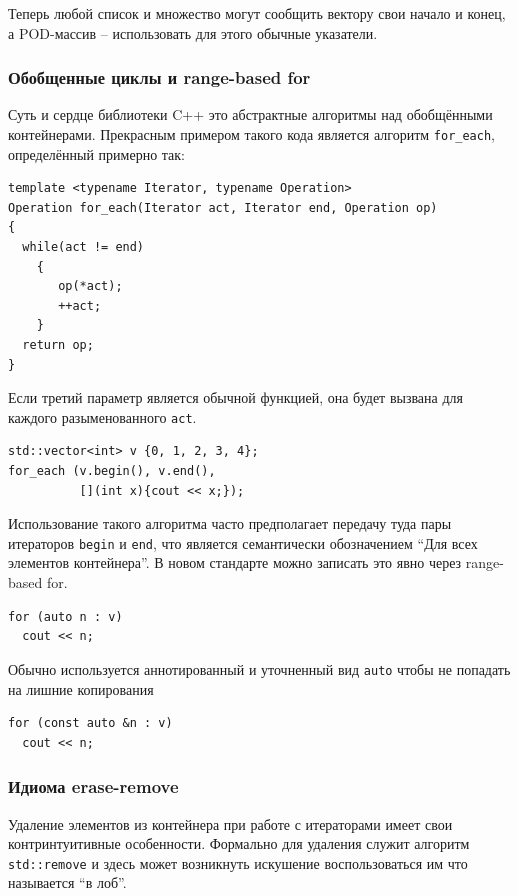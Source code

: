 \documentclass[a4paper,12pt,oneside]{article}
\begin{document}
Теперь любой список и множество могут сообщить вектору свои начало и конец, а POD-массив -- использовать для этого обычные указатели.

\subsubsection{Обобщенные циклы и range-based for}

Суть и сердце библиотеки C++ это абстрактные алгоритмы над обобщёнными контейнерами. Прекрасным примером такого кода является алгоритм \lstinline!for_each!, определённый примерно так:

\begin{lstlisting}
template <typename Iterator, typename Operation>
Operation for_each(Iterator act, Iterator end, Operation op)
{
  while(act != end)
    {
       op(*act);
       ++act;
    }
  return op;
}
\end{lstlisting}

Если третий параметр является обычной функцией, она будет вызвана для каждого разыменованного \lstinline!act!. 

\begin{lstlisting}
std::vector<int> v {0, 1, 2, 3, 4};
for_each (v.begin(), v.end(), 
          [](int x){cout << x;});
\end{lstlisting}

Использование такого алгоритма часто предполагает передачу туда пары итераторов \lstinline!begin! и \lstinline!end!, что является семантически обозначением ``Для всех элементов контейнера''. В новом стандарте можно записать это явно через range-based for.

\begin{lstlisting}
for (auto n : v)
  cout << n;
\end{lstlisting}

Обычно используется аннотированный и уточненный вид  \lstinline!auto! чтобы не попадать на лишние копирования

\begin{lstlisting}
for (const auto &n : v)
  cout << n;
\end{lstlisting}

\subsubsection{Идиома erase-remove}

Удаление элементов из контейнера при работе с итераторами имеет свои контринтуитивные особенности. Формально для удаления служит алгоритм \lstinline!std::remove! и здесь может возникнуть искушение воспользоваться им что называется ``в лоб''.
\end{document}

